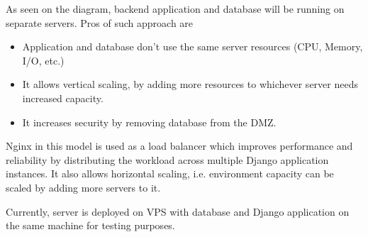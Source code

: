 As seen on the diagram, backend application and database will be running on separate servers. Pros of such approach are

\begin{itemize}
    \item Application and database don't use the same server resources (CPU, Memory, I/O, etc.)
    \item It allows vertical scaling, by adding more resources to whichever server needs increased capacity.
    \item It increases security by removing database from the \ac{DMZ}.
\end{itemize}

Nginx in this model is used as a load balancer which improves performance and reliability by distributing the workload
across multiple Django application instances. It also allows horizontal scaling, i.e. environment capacity can be scaled
by adding more servers to it.

Currently, server is deployed on \ac{VPS} with database and Django application on the same machine for testing purposes.
